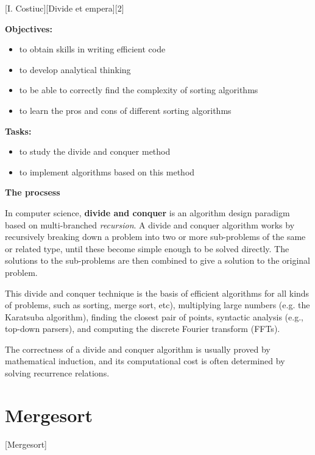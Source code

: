 \documentclass{article}
\begin{document}
	[I. Costiuc][Divide et empera][2]

	{\Large \textbf{Objectives:}}
	\begin{itemize}
		\item to obtain skills in writing efficient code
		\item to develop analytical thinking
		\item to be able to correctly find the complexity of sorting algorithms
		\item to learn the pros and cons of different sorting algorithms
	\end{itemize}

	{\Large \textbf{Tasks:}}
	\begin{itemize}
		\item to study the divide and conquer method
		\item to implement algorithms based on this method
	\end{itemize}

	\begin{center}
		{\Large \textbf{The procsess}}
	\end{center}

	\par In computer science, \textbf{divide and conquer} is an algorithm design paradigm based on multi-branched \textit{recursion}. A divide and conquer algorithm works by recursively breaking down a problem into two or more sub-problems of the same or related type, until these become simple enough to be solved directly. The solutions to the sub-problems are then combined to give a solution to the original problem.

	\par This divide and conquer technique is the basis of efficient algorithms for all kinds of problems, such as sorting, merge sort, etc), multiplying large numbers (e.g. the Karatsuba algorithm), finding the closest pair of points, syntactic analysis (e.g., top-down parsers), and computing the discrete Fourier transform (FFTs).

	\par The correctness of a divide and conquer algorithm is usually proved by mathematical induction, and its computational cost is often determined by solving recurrence relations.

	\newpage
	\section{Mergesort}
		[Mergesort]
\end{document}
